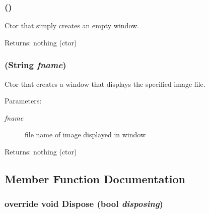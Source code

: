 \subsubsection{ ()}\label{class_c_s_image_viewer_1_1_c_s_image_viewer_948095f67179ef14489f75c7ad5d0745}


Ctor that simply creates an empty window. 

\begin{Desc}
\item[Returns:]nothing (ctor) \end{Desc}
\subsubsection{ (String {\em fname})}\label{class_c_s_image_viewer_1_1_c_s_image_viewer_c9177447d92704bc773976f6c6d7a7db}


Ctor that creates a window that displays the specified image file. 

\begin{Desc}
\item[Parameters:]
\begin{description}
\item[{\em fname}]file name of image displayed in window \end{description}
\end{Desc}
\begin{Desc}
\item[Returns:]nothing (ctor) \end{Desc}


\subsection{Member Function Documentation}
\subsubsection{\setlength{\rightskip}{0pt plus 5cm}override void Dispose (bool {\em disposing})\hspace{0.3cm}{\tt  [protected]}}\label{class_c_s_image_viewer_1_1_c_s_image_viewer_849c3c7f8d08104f0cdb46bee9fe6389}


